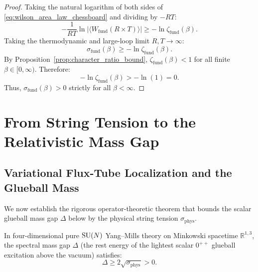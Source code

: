 \begin{proof}
Taking the natural logarithm of both sides of \eqref{eq:wilson_area_law_chessboard} and dividing by $-RT$:
\begin{equation}
-\frac{1}{RT} \ln \left| \langle W_{\mathrm{fund}}(R \times T) \rangle \right| \ge -\ln \zeta_{\mathrm{fund}}(\beta).
\end{equation}
Taking the thermodynamic and large-loop limit $R, T \to \infty$:
\begin{equation}
\sigma_{\mathrm{fund}}(\beta) \ge -\ln \zeta_{\mathrm{fund}}(\beta).
\end{equation}
By Proposition~\ref{prop:character_ratio_bound}, $\zeta_{\mathrm{fund}}(\beta) < 1$ for all finite $\beta \in [0, \infty)$. Therefore:
\begin{equation}
-\ln \zeta_{\mathrm{fund}}(\beta) > -\ln(1) = 0.
\end{equation}
Thus, $\sigma_{\mathrm{fund}}(\beta) > 0$ strictly for all $\beta < \infty$.
\end{proof}

\section{From String Tension to the Relativistic Mass Gap}
\label{sec:tension_to_mass_gap}

\subsection{Variational Flux-Tube Localization and the Glueball Mass}
\label{subsec:flux_tube_localization}

We now establish the rigorous operator-theoretic theorem that bounds the scalar glueball mass gap $\Delta$ below by the physical string tension $\sigma_{\mathrm{phys}}$.

\begin{proposition}
\label{prop:glueball_tension_bound}
In four-dimensional pure $\mathrm{SU}(N)$ Yang--Mills theory on Minkowski spacetime $\mathbb{R}^{1,3}$, the spectral mass gap $\Delta$ (the rest energy of the lightest scalar $0^{++}$ glueball excitation above the vacuum) satisfies:
\begin{equation}
\label{eq:glueball_mass_string_bound_final}
\Delta \ge 2 \sqrt{\sigma_{\mathrm{phys}}} > 0.
\end{equation}
\end{proposition}

